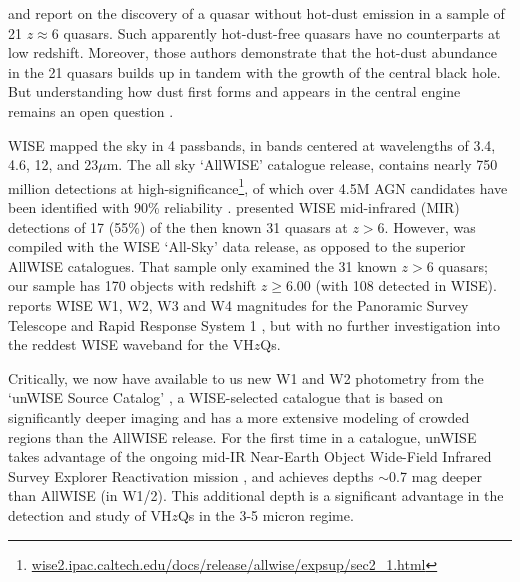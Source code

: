 \documentclass[usenatbib]{mnras}
\begin{document}
\citet{Jiang2006dust} and \citet{Jiang2010} report on the discovery of
a quasar without hot-dust emission in a sample of 21 $z\approx6$
quasars. Such apparently hot-dust-free quasars have no counterparts at
low redshift. Moreover, those authors demonstrate that the hot-dust
abundance in the 21 quasars builds up in tandem with the growth of the
central black hole. But understanding how dust first forms and appears
in the central engine remains an open question \citep{WangR2008,
WangR2011}.

WISE mapped the sky in 4 passbands, in bands centered at wavelengths
of 3.4, 4.6, 12, and 23$\mu$m. The all sky `AllWISE' catalogue
release, contains nearly 750 million detections at
high-significance\footnote{\href{wise2.ipac.caltech.edu/docs/release/allwise/expsup/sec2\_1.html}{wise2.ipac.caltech.edu/docs/release/allwise/expsup/sec2\_1.html}},
of which over 4.5M AGN candidates have been identified with 90\%
reliability \citep{Assef2018}.  \citet{Blain2013} presented WISE
mid-infrared (MIR) detections of 17 (55\%) of the then known 31
quasars at $z > 6$. However, \citet{Blain2013} was compiled with the
WISE `All-Sky' data release, as opposed to the superior AllWISE
catalogues. That sample only examined the 31 known $z>6$ quasars; our
sample has 170 objects with redshift $z \geq 6.00$ (with 108 detected
in WISE). \citet{Banados2016} reports WISE W1, W2, W3 and W4
magnitudes for the Panoramic Survey Telescope and Rapid Response
System 1 \citep[Pan-STARRS1, PS1;][]{Kaiser2002, Kaiser2010}, but with
no further investigation into the reddest WISE waveband for the
VH$z$Qs.

Critically, we now have available to us new W1 and W2 photometry from
the `unWISE Source Catalog' \citep[][]{Schlafly2019}, a WISE-selected
catalogue that is based on significantly deeper imaging and has a more
extensive modeling of crowded regions than the AllWISE release. For
the first time in a catalogue, unWISE takes advantage of the ongoing
mid-IR Near-Earth Object Wide-Field Infrared Survey Explorer
Reactivation mission \citep[NEOWISE-R; ][]{Mainzer2014}, and achieves
depths $\sim$0.7 mag deeper than AllWISE (in W1/2).  This additional
depth is a significant advantage in the detection and study of VH$z$Qs
in the 3-5 micron regime.
\end{document}
